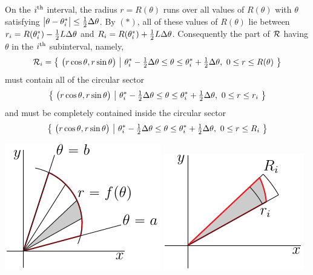 On the $i^{\rm th}$ interval, the radius $r=R(\theta)$ runs over all
values of $R(\theta)$ with $\theta$ satisfying $\big|\theta-\theta_i^*\big|\le\frac{1}{2}\Delta\theta$.
By $(*)$, all of these values of $R(\theta)$ lie between
$r_i=R(\theta_i^*)-\frac{1}{2} L\Delta\theta$ and 
$R_i=R(\theta_i^*) +\frac{1}{2} L\Delta\theta$.
Consequently the part of $\mathcal{R}$ having $\theta$ in the $i^{\rm th}$
subinterval, namely,
\begin{equation*}
\mathcal{R}_i=\big\{ \ \big(r\cos\theta,r\sin\theta\big)\ \big|\ \theta_i^*-\tfrac{1}{2}\Delta\theta\le\theta\le \theta_i^*+\tfrac{1}{2}\Delta\theta,
           \ 0\le r\le R(\theta)\ \big\}
\end{equation*}
must contain all of the circular sector
\begin{equation*}
\big\{ \ \big(r\cos\theta,r\sin\theta\big)\ \big|\ \theta_i^*-\tfrac{1}{2}\Delta\theta\le\theta\le \theta_i^*+\tfrac{1}{2}\Delta\theta,
           \ 0\le r\le r_i\ \big\}
\end{equation*}
and must be completely contained inside the circular sector 
\begin{equation*}
\big\{ \ \big(r\cos\theta,r\sin\theta\big)\ \big|\ \theta_i^*-\tfrac{1}{2}\Delta\theta\le\theta\le \theta_i^*+\tfrac{1}{2}\Delta\theta,
           \ 0\le r\le R_i\ \big\}
\end{equation*}
\begin{efig}
\begin{center}
    \includegraphics{polarArea.pdf}\qquad\qquad
    \includegraphics{polarArea2.pdf}
\end{center}
\end{efig}
